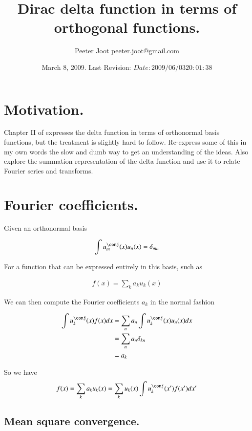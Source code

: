 \documentclass{article}
\title{ Dirac delta function in terms of orthogonal functions. }
\author{Peeter Joot \quad peeter.joot@gmail.com }
\date{ March 8, 2009.  Last Revision: $Date: 2009/06/03 20:01:38 $ }
\begin{document}
\maketitle{}

\section{Motivation. }

Chapter II of \cite{pauli2000wm} expresses the delta function in terms of
orthonormal basis functions, but the treatment is slightly
hard to follow.  
Re-express some of this in my own words the slow and dumb way to get an
understanding of the ideas.  Also explore the summation representation of
the delta function and use it to relate Fourier series and transforms.

\section{Fourier coefficients. }

Given an orthonormal basis 

\begin{align*}
\int u_m^\conj(x) u_n(x) = \delta_{mn}
\end{align*}

For a function that can be expressed entirely in this basis, such as

\begin{align*}
f(x) = \sum_k a_k u_k(x)
\end{align*}

We can then compute the Fourier coefficients $a_k$ in the normal fashion

\begin{align*}
\int u_k^\conj(x) f(x) dx 
&= \sum_n a_n \int u_k^\conj(x) u_n(x) dx \\
&= \sum_n a_n \delta_{kn} \\
&= a_k \\
\end{align*}

So we have 
\begin{align*}
f(x) = \sum_k a_k u_k(x)  = \sum_k u_k(x) \int u_k^\conj(x') f(x') dx'
\end{align*}

\subsection{Mean square convergence. }
\end{document}
